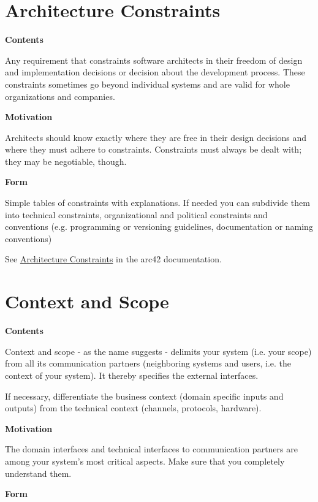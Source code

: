 \documentclass[
]{article}
\begin{document}
\hypertarget{section-architecture-constraints}{%
\section{Architecture
Constraints}\label{section-architecture-constraints}}

\textbf{Contents}

Any requirement that constraints software architects in their freedom of
design and implementation decisions or decision about the development
process. These constraints sometimes go beyond individual systems and
are valid for whole organizations and companies.

\textbf{Motivation}

Architects should know exactly where they are free in their design
decisions and where they must adhere to constraints. Constraints must
always be dealt with; they may be negotiable, though.

\textbf{Form}

Simple tables of constraints with explanations. If needed you can
subdivide them into technical constraints, organizational and political
constraints and conventions (e.g. programming or versioning guidelines,
documentation or naming conventions)

See \href{https://docs.arc42.org/section-2/}{Architecture Constraints}
in the arc42 documentation.

\hypertarget{section-context-and-scope}{%
\section{Context and Scope}\label{section-context-and-scope}}

\textbf{Contents}

Context and scope - as the name suggests - delimits your system (i.e.
your scope) from all its communication partners (neighboring systems and
users, i.e. the context of your system). It thereby specifies the
external interfaces.

If necessary, differentiate the business context (domain specific inputs
and outputs) from the technical context (channels, protocols, hardware).

\textbf{Motivation}

The domain interfaces and technical interfaces to communication partners
are among your system's most critical aspects. Make sure that you
completely understand them.

\textbf{Form}
\end{document}
